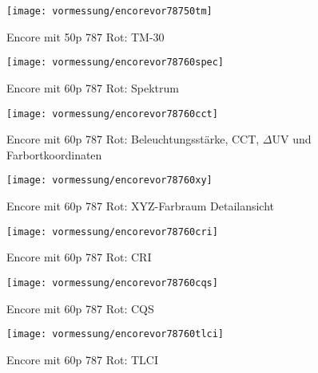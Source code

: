\documentclass[pagesize,paper=A4,fontsize=12pt,utf8,numbers=noenddot,bibliography=totoc,listof=totoc,DIV=11,BCOR=1mm]{scrreprt}
\begin{document}
\begin{figure}[htp]     %
\centering
\texttt{[image: vormessung/encorevor78750tm]} 
\caption {Encore mit 50p 787 Rot: TM-30} 
\end{figure}




\begin{figure}[htp]     %
\centering
\texttt{[image: vormessung/encorevor78760spec]} 
\caption {Encore mit 60p 787 Rot: Spektrum} 
\end{figure}

\begin{figure}[htp]     %
\centering
\texttt{[image: vormessung/encorevor78760cct]} 
\caption {Encore mit 60p 787 Rot: Beleuchtungsstärke, CCT, $\Delta$UV und Farbortkoordinaten} 
\end{figure}

\begin{figure}[htp]     %
\centering
\texttt{[image: vormessung/encorevor78760xy]} 
\caption {Encore mit 60p 787 Rot: XYZ-Farbraum Detailansicht} 
\end{figure}

\begin{figure}[htp]     %
\centering
\texttt{[image: vormessung/encorevor78760cri]} 
\caption {Encore mit 60p 787 Rot: CRI} 
\end{figure}

\begin{figure}[htp]     %
\centering
\texttt{[image: vormessung/encorevor78760cqs]} 
\caption {Encore mit 60p 787 Rot: CQS} 
\end{figure}

\begin{figure}[htp]     %
\centering
\texttt{[image: vormessung/encorevor78760tlci]} 
\caption {Encore mit 60p 787 Rot: TLCI} 
\end{figure}
\end{document}
